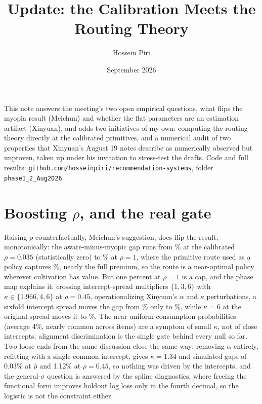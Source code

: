 \documentclass[11pt]{article}
\title{Update: the Calibration Meets the Routing Theory}
\author{Hossein Piri}
\date{September 2026}
\begin{document}
\maketitle

\noindent
This note answers the meeting's two open empirical questions, what flips
the myopia result (Meichun) and whether the flat parameters are an
estimation artifact (Xinyuan), and adds two initiatives of my own:
computing the routing theory directly at the calibrated primitives, and a
numerical audit of two properties that Xinyuan's August 19 notes describe
as numerically observed but unproven, taken up under his invitation to
stress-test the drafts.
Code and full results: \texttt{github.com/hosseinpiri/recommendation-systems},
folder \texttt{phase1\_2\_Aug2026}.

\section{Boosting $\rho$, and the real gate}

Raising $\rho$ counterfactually, Meichun's suggestion, does flip the
result, monotonically: the
aware-minus-myopic gap runs from \rGapBase\% at the calibrated
$\rho=0.035$ (statistically zero) to \rGapOne\% at $\rho=1$, where the
primitive route used as a policy captures \rRoute\%, nearly the full
premium, so the route is a near-optimal policy wherever cultivation has
value. But one percent at $\rho=1$ is a cap, and the phase map explains
it: crossing intercept-spread multipliers $\{1,3,6\}$ with
$\kappa\in\{1.966,4,6\}$ at $\rho=0.45$, operationalizing Xinyuan's
$\alpha$ and $\kappa$ perturbations, a sixfold intercept spread moves
the gap from \phKhat\% only to \phSpreadSix\%, while $\kappa=6$ at the
original spread moves it to \phKsix\%. The near-uniform consumption
probabilities (average 4\%, nearly common across items) are a symptom of
small $\kappa$, not of close intercepts; alignment discrimination is the
single gate behind every null so far. Two loose ends from the same
discussion close the same way: removing $\alpha$ entirely, refitting with
a single common intercept, gives $\kappa=1.34$ and simulated gaps of
0.03\% at $\hat\rho$ and 1.12\% at $\rho=0.45$, so nothing was driven
by the intercepts; and the general-$\sigma$ question is answered by the
spline diagnostics, where freeing the functional form improves holdout
log loss only in the fourth decimal, so the logistic is not the
constraint either.
\end{document}

